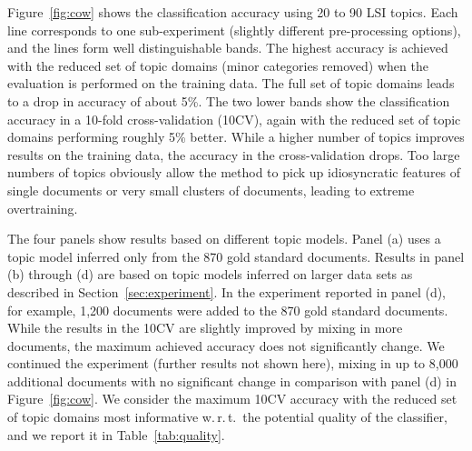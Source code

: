 \documentclass[11pt]{article}
\begin{document}
Figure~\ref{fig:cow} shows the classification accuracy using 20 to 90 LSI topics.
Each line corresponds to one sub-experiment (slightly different pre-processing options), and the lines form well distinguishable bands.
The highest accuracy is achieved with the reduced set of topic domains (minor categories removed) when the evaluation is performed on the training data.
The full set of topic domains leads to a drop in accuracy of about 5\%.
The two lower bands show the classification accuracy in a 10-fold cross-validation (10CV), again with the reduced set of topic domains performing roughly 5\% better.
While a higher number of topics improves results on the training data, the accuracy in the cross-validation drops.
Too large numbers of topics obviously allow the method to pick up idiosyncratic features of single documents or very small clusters of documents, leading to extreme overtraining.

The four panels show results based on different topic models.
Panel (a) uses a topic model inferred only from the 870 gold standard documents.
Results in panel (b) through (d) are based on topic models inferred on larger data sets as described in Section~\ref{sec:experiment}.
In the experiment reported in panel (d), for example, 1,200 documents were added to the 870 gold standard documents.
While the results in the 10CV are slightly improved by mixing in more documents, the maximum achieved accuracy does not significantly change.
We continued the experiment (further results not shown here), mixing in up to 8,000 additional documents with no significant change in comparison with panel (d) in Figure~\ref{fig:cow}.
We consider the maximum 10CV accuracy with the reduced set of topic domains most informative w.\,r.\,t.\ the potential quality of the classifier, and we report it in Table~\ref{tab:quality}.

\end{document}
